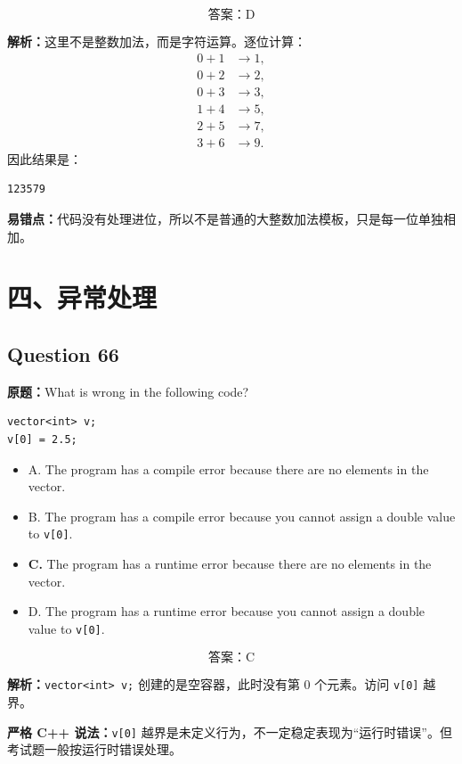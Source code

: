 \documentclass[11pt, a4paper]{article}
\begin{document}
\[
\boxed{\text{答案：D}}
\]

\textbf{解析：}这里不是整数加法，而是字符运算。逐位计算：
\[
\begin{aligned}
0+1 &\to 1,\\
0+2 &\to 2,\\
0+3 &\to 3,\\
1+4 &\to 5,\\
2+5 &\to 7,\\
3+6 &\to 9.
\end{aligned}
\]
因此结果是：
\begin{lstlisting}
123579
\end{lstlisting}

\textbf{易错点：}代码没有处理进位，所以不是普通的大整数加法模板，只是每一位单独相加。


\section*{四、异常处理}

\subsection*{Question 66}
\textbf{原题：}What is wrong in the following code?
\begin{lstlisting}
vector<int> v;
v[0] = 2.5;
\end{lstlisting}
\begin{itemize}
    \item A. The program has a compile error because there are no elements in the vector.
    \item B. The program has a compile error because you cannot assign a double value to \texttt{v[0]}.
    \item \textbf{C.} The program has a runtime error because there are no elements in the vector.
    \item D. The program has a runtime error because you cannot assign a double value to \texttt{v[0]}.
\end{itemize}

\[
\boxed{\text{答案：C}}
\]

\textbf{解析：}\texttt{vector<int> v;} 创建的是空容器，此时没有第 0 个元素。访问 \texttt{v[0]} 越界。

\textbf{严格 C++ 说法：}\texttt{v[0]} 越界是未定义行为，不一定稳定表现为“运行时错误”。但考试题一般按运行时错误处理。
\end{document}
